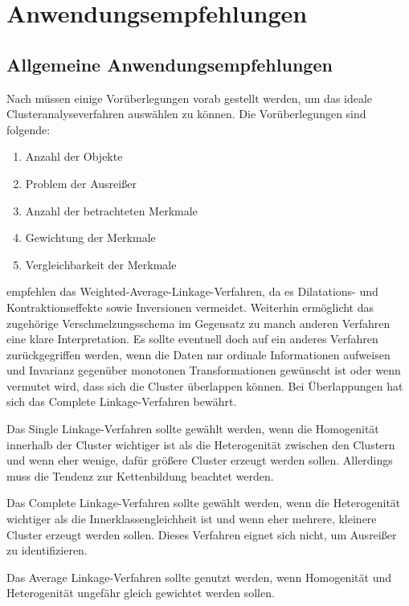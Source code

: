 \chapter{Anwendungsempfehlungen}

\section{Allgemeine Anwendungsempfehlungen}

Nach \citet[S. 510]{Backhaus.2016} müssen einige Vorüberlegungen vorab gestellt werden, um das ideale Clusteranalyseverfahren auswählen zu können. Die Vorüberlegungen sind folgende:
\begin{enumerate}
    \item Anzahl der Objekte
    \item Problem der Ausreißer
    \item Anzahl der betrachteten Merkmale
    \item Gewichtung der Merkmale
    \item Vergleichbarkeit der Merkmale
\end{enumerate}

\citet[S. 275]{Bacher.2010} empfehlen das Weighted-Average-Linkage-Verfahren, da es Dilatations- und Kontraktionseffekte sowie Inversionen vermeidet. Weiterhin ermöglicht das zugehörige Verschmelzungsschema im Gegensatz zu manch anderen Verfahren eine klare Interpretation. Es sollte eventuell doch auf ein anderes Verfahren zurückgegriffen werden, wenn die Daten nur ordinale Informationen aufweisen und Invarianz gegenüber monotonen Transformationen gewünscht ist oder wenn vermutet wird, dass sich die Cluster überlappen können. Bei Überlappungen hat sich das Complete Linkage-Verfahren bewährt.

Das Single Linkage-Verfahren sollte gewählt werden, wenn die Homogenität innerhalb der Cluster wichtiger ist als die Heterogenität zwischen den Clustern und wenn eher wenige, dafür größere Cluster erzeugt werden sollen. Allerdings muss die Tendenz zur Kettenbildung beachtet werden.

Das Complete Linkage-Verfahren sollte gewählt werden, wenn die Heterogenität wichtiger als die Innerklassengleichheit ist und wenn eher mehrere, kleinere Cluster erzeugt werden sollen. Dieses Verfahren eignet sich nicht, um Ausreißer zu identifizieren.

Das Average Linkage-Verfahren sollte genutzt werden, wenn Homogenität und Heterogenität ungefähr gleich gewichtet werden sollen.

